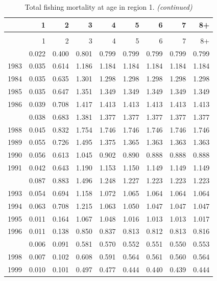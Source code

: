 \documentclass[
]{article}
\begin{document}
\begin{longtable}[t]{lrrrrrrrr}
\caption{\label{tab:region_1-region-FAA-table}Total fishing mortality at age in region 1.}\\
\toprule
  & 1 & 2 & 3 & 4 & 5 & 6 & 7 & 8+\\
\midrule
\endfirsthead
\caption[]{Total fishing mortality at age in region 1. \textit{(continued)}}\\
\toprule
  & 1 & 2 & 3 & 4 & 5 & 6 & 7 & 8+\\
\midrule
\endhead

\endfoot
\bottomrule
\endlastfoot
1982 & 0.022 & 0.400 & 0.801 & 0.799 & 0.799 & 0.799 & 0.799 & 0.799\\
1983 & 0.035 & 0.614 & 1.186 & 1.184 & 1.184 & 1.184 & 1.184 & 1.184\\
1984 & 0.035 & 0.635 & 1.301 & 1.298 & 1.298 & 1.298 & 1.298 & 1.298\\
1985 & 0.035 & 0.647 & 1.351 & 1.349 & 1.349 & 1.349 & 1.349 & 1.349\\
1986 & 0.039 & 0.708 & 1.417 & 1.413 & 1.413 & 1.413 & 1.413 & 1.413\\
\addlinespace
1987 & 0.038 & 0.683 & 1.381 & 1.377 & 1.377 & 1.377 & 1.377 & 1.377\\
1988 & 0.045 & 0.832 & 1.754 & 1.746 & 1.746 & 1.746 & 1.746 & 1.746\\
1989 & 0.055 & 0.726 & 1.495 & 1.375 & 1.365 & 1.363 & 1.363 & 1.363\\
1990 & 0.056 & 0.613 & 1.045 & 0.902 & 0.890 & 0.888 & 0.888 & 0.888\\
1991 & 0.042 & 0.643 & 1.190 & 1.153 & 1.150 & 1.149 & 1.149 & 1.149\\
\addlinespace
1992 & 0.087 & 0.883 & 1.496 & 1.248 & 1.227 & 1.223 & 1.223 & 1.223\\
1993 & 0.054 & 0.694 & 1.158 & 1.072 & 1.065 & 1.064 & 1.064 & 1.064\\
1994 & 0.063 & 0.708 & 1.215 & 1.063 & 1.050 & 1.047 & 1.047 & 1.047\\
1995 & 0.011 & 0.164 & 1.067 & 1.048 & 1.016 & 1.013 & 1.013 & 1.017\\
1996 & 0.011 & 0.138 & 0.850 & 0.837 & 0.813 & 0.812 & 0.813 & 0.816\\
\addlinespace
1997 & 0.006 & 0.091 & 0.581 & 0.570 & 0.552 & 0.551 & 0.550 & 0.553\\
1998 & 0.007 & 0.102 & 0.608 & 0.591 & 0.564 & 0.561 & 0.560 & 0.564\\
1999 & 0.010 & 0.101 & 0.497 & 0.477 & 0.444 & 0.440 & 0.439 & 0.444\\

\end{longtable}
\end{document}
